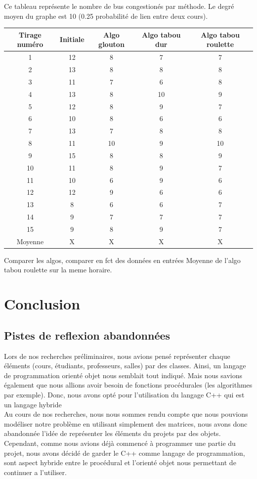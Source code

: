 \documentclass[a4paper,11pt]{article}
\begin{document}
	Ce tableau représente le nombre de bus congestionés par méthode. Le degré moyen du graphe est 10 (0.25 probabilité de lien entre deux cours).\\ 
	\begin{tabular}{|c|c|c|c|c|}
  		\hline
  		Tirage numéro & Initiale & Algo glouton & Algo tabou dur & Algo tabou roulette\\
  		\hline
  		1 & 12 & 8 & 7 & 7\\
  		\hline
  		2 & 13& 8& 8&8\\
  		\hline
  		3 & 11 & 7 & 6 & 8\\
  		\hline
  		4 & 13 & 8 & 10 & 9\\
  		\hline
  		5 & 12 & 8 & 9 & 7\\
  		\hline
  		6 & 10 & 8 & 6 & 6\\
  		\hline
  		7 & 13 & 7 & 8 & 8\\
  		\hline
  		8 & 11 & 10 & 9 & 10\\
  		\hline
  		9 & 15 & 8 & 8 & 9\\
  		\hline
  		10 & 11 & 8 & 9 & 7\\
  		\hline
  		11 & 10 & 6 & 9 & 6\\
  		\hline
  		12 & 12 & 9 & 6 & 6\\
  		\hline
  		13 & 8 & 6 & 6 & 7\\
  		\hline
  		14 & 9 & 7 & 7 & 7\\
  		\hline
  		15 & 9 & 8 & 9 & 7\\
  		\hline
  		Moyenne & X & X & X & X\\
  		\hline
	\end{tabular}

	Comparer les algos, comparer en fct des données en entrées
	Moyenne de l'algo tabou roulette sur la meme horaire.
	
\section{Conclusion}
	\subsection{Pistes de reflexion abandonnées}
		Lors de nos recherches préliminaires, nous avions pensé représenter chaque éléments (cours, étudiants, professeurs, salles) par des classes. Ainsi, un langage de programmation orienté objet nous semblait tout indiqué. Mais nous savions également que nous allions avoir besoin de fonctions procédurales (les algorithmes par exemple). Donc, nous avons opté pour l'utilisation du langage C++ qui est un langage hybride\\
		Au cours de nos recherches, nous nous sommes rendu compte que nous pouvions modéliser notre problème en utilisant simplement des matrices, nous avons donc abandonnée l'idée de représenter les éléments du projets par des objets.\\
		Cependant, comme nous avions déjà commencé à programmer une partie du projet, nous avons décidé de garder le C++ comme langage de programmation, sont aspect hybride entre le procédural et l'orienté objet nous permettant de continuer a l'utiliser.
	
\end{document}
